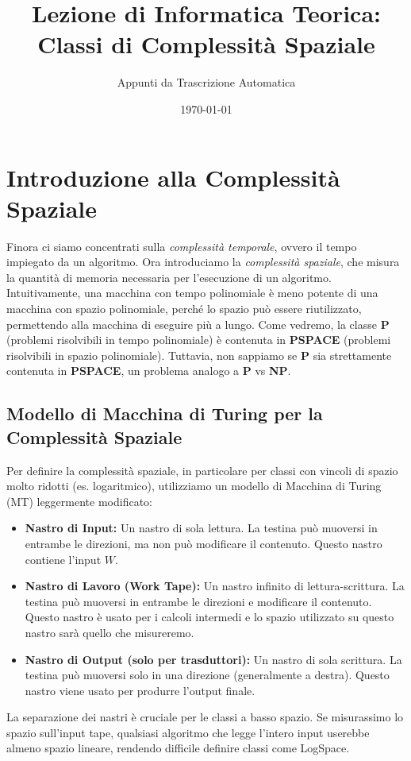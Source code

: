 \documentclass[a4paper]{article}
\title{Lezione di Informatica Teorica: Classi di Complessità Spaziale}
\author{Appunti da Trascrizione Automatica}
\date{\today}
\begin{document}
\maketitle
\tableofcontents
\newpage

\section{Introduzione alla Complessità Spaziale}

Finora ci siamo concentrati sulla \emph{complessità temporale}, ovvero il tempo impiegato da un algoritmo. Ora introduciamo la \emph{complessità spaziale}, che misura la quantità di memoria necessaria per l'esecuzione di un algoritmo.
Intuitivamente, una macchina con tempo polinomiale è meno potente di una macchina con spazio polinomiale, perché lo spazio può essere riutilizzato, permettendo alla macchina di eseguire più a lungo.
Come vedremo, la classe \textbf{P} (problemi risolvibili in tempo polinomiale) è contenuta in \textbf{PSPACE} (problemi risolvibili in spazio polinomiale). Tuttavia, non sappiamo se \textbf{P} sia strettamente contenuta in \textbf{PSPACE}, un problema analogo a \textbf{P} vs \textbf{NP}.

\subsection{Modello di Macchina di Turing per la Complessità Spaziale}

Per definire la complessità spaziale, in particolare per classi con vincoli di spazio molto ridotti (es. logaritmico), utilizziamo un modello di Macchina di Turing (MT) leggermente modificato:
\begin{itemize}
    \item \textbf{Nastro di Input:} Un nastro di sola lettura. La testina può muoversi in entrambe le direzioni, ma non può modificare il contenuto. Questo nastro contiene l'input $W$.
    \item \textbf{Nastro di Lavoro (Work Tape):} Un nastro infinito di lettura-scrittura. La testina può muoversi in entrambe le direzioni e modificare il contenuto. Questo nastro è usato per i calcoli intermedi e lo spazio utilizzato su questo nastro sarà quello che misureremo.
    \item \textbf{Nastro di Output (solo per trasduttori):} Un nastro di sola scrittura. La testina può muoversi solo in una direzione (generalmente a destra). Questo nastro viene usato per produrre l'output finale.
\end{itemize}
La separazione dei nastri è cruciale per le classi a basso spazio. Se misurassimo lo spazio sull'input tape, qualsiasi algoritmo che legge l'intero input userebbe almeno spazio lineare, rendendo difficile definire classi come LogSpace.
\end{document}
